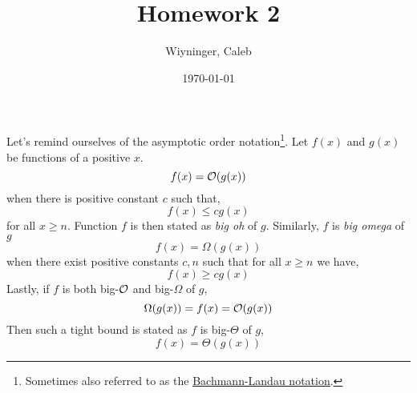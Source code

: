 \documentclass{homework}
\author{Wiyninger, Caleb}
\date{\today}
\title{Homework 2}
\begin{document}
 \maketitle

Let's remind ourselves of the asymptotic order
notation\footnote{Sometimes also referred to as the
  \href{https://en.wikipedia.org/wiki/Big_O_notation}{Bachmann-Landau
    notation}.}. Let $f(x)$ and $g(x)$ be functions of a positive $x$.
\[
  f(x) = \mathcal{O}(g(x))
\]
when there is positive constant $c$ such that,
\[
  f(x) \leq cg(x)
\]
for all $x \geq n$. Function $f$ is then stated as \textit{big oh}
of $g$. Similarly, $f$ is \textit{big omega} of $g$ \ie
\[
  f(x) = \Omega(g(x))
\]
when there exist positive constants $c, n$ such that for all $x
  \geq n$ we have,
\[
  f(x) \geq cg(x)
\]
Lastly, if $f$ is both big-$\mathcal{O}$ and big-$\Omega$ of $g$,
\[
  \Omega(g(x)) = f(x) = \mathcal{O}(g(x))
\]
Then such a tight bound is stated as $f$ is big-$\Theta$ of $g$,
\[
  f(x) = \Theta(g(x))
\]
\end{document}
